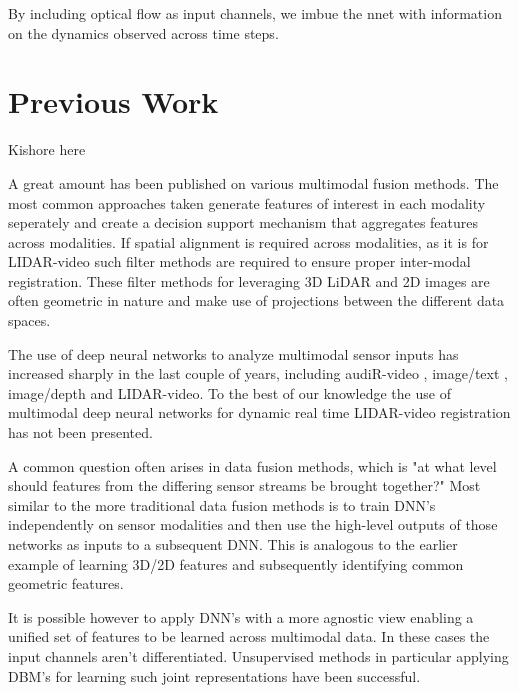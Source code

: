 \documentclass{article}
\begin{document}
By including optical flow as input channels, we imbue the nnet with information on the dynamics observed across time steps. 


\section{Previous Work} %
\label{sec:previous_work}
Kishore here

A great amount has been published on various multimodal fusion methods. The most common approaches taken generate features of interest in each modality seperately and create a decision support mechanism that aggregates features across modalities. If spatial alignment is required across modalities, as it is for LIDAR-video such filter methods \cite{Thrun2011Googles-dr} are required to ensure proper inter-modal registration. These filter methods for leveraging 3D LiDAR and 2D images are often geometric in nature and make use of projections between the different data spaces. 




The use of deep neural networks to analyze multimodal sensor inputs  has increased sharply in the last couple of years, including audiR-video \cite{Ngiam2011Multimodal} \cite{Kim2013Deep-Learn}, image/text \cite{Srivastava2012Multimodal}, image/depth \cite{Lenz2013Deep-Learn} and LIDAR-video. To the best of our knowledge the use of multimodal deep neural networks for dynamic real time LIDAR-video registration has not been presented.

A common question often arises in data fusion methods, which is "at what level should features from the differing sensor streams be brought together?" Most similar to the more traditional data fusion methods is to train DNN's independently on sensor modalities and then use the high-level outputs of those networks as inputs to a subsequent DNN. This is analogous to the earlier example of learning 3D/2D features and subsequently identifying common geometric features. 

It is possible however to apply DNN's with a more agnostic view enabling a unified set of features to be learned across multimodal data. In these cases the input channels aren't differentiated. Unsupervised methods in particular applying DBM's for learning such joint representations have been successful.  
\end{document}
